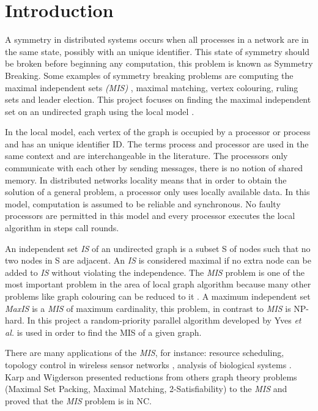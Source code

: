 \section{Introduction}
\label{cap:1}

A symmetry in distributed systems occurs when all processes in a network are in the same state, possibly with an unique identifier. This state of symmetry should be broken before beginning any computation, this problem is known as Symmetry Breaking. Some examples of symmetry breaking problems are computing the maximal independent sets \textit{(MIS)} , maximal matching, vertex colouring, ruling sets and leader election. This project focuses on finding the maximal independent set on an undirected graph using the local model \cite{linial1992locality}.

In the local model, each vertex of the graph is occupied by a processor or process and has an unique identifier ID. The terms process and processor are used in the same context and are interchangeable in the literature. The processors only communicate with each other by sending messages, there is no notion of shared memory. In distributed networks locality means that in order to obtain the solution of a general problem, a processor only uses locally available data. In this model, computation is assumed to be reliable and synchronous. No faulty processors are permitted in this model and every processor executes the local algorithm in steps call rounds.  

An independent set \textit{IS} of an undirected graph is a subset S of nodes such that no two nodes in S are adjacent. An \textit{IS} is considered maximal if no extra node can be added to \textit{IS} without violating the independence. The \textit{MIS} problem is one of the most important problem in the area of local graph algorithm because many other problems like graph colouring can be reduced to it \cite{panconesi1992improved}. A maximum independent set \textit{MaxIS} is a \textit{MIS} of maximum cardinality, this problem, in contrast to \textit{MIS} is NP-hard. In this project a random-priority parallel algorithm developed by Yves \textit{et al.} \cite{yves2009optimal} is used in order to find the MIS of a given graph.

There are many applications of the \textit{MIS}, for instance: resource scheduling, topology control in wireless sensor networks \cite{basagni2001finding}, analysis of biological systems \cite{afek2013beeping}. Karp and Wigderson \cite{karp1986constructing} presented reductions from \newline others graph theory problems (Maximal Set Packing, Maximal Matching, 2-Satisfiability) to the \textit{MIS} and proved that the \textit{MIS} problem is in NC.

